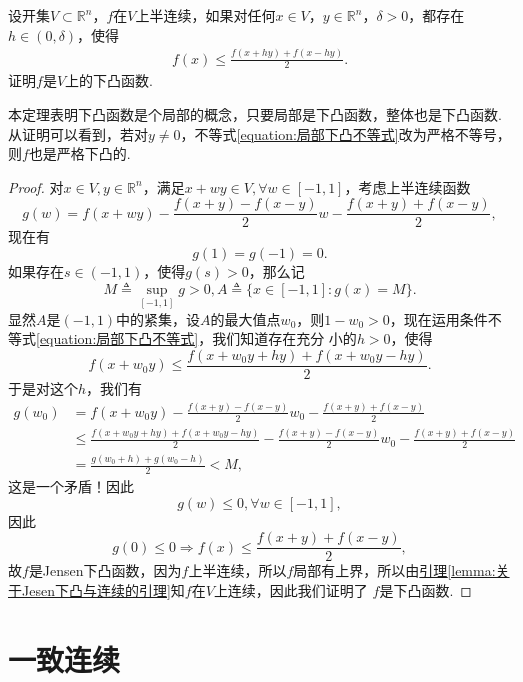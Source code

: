 \documentclass[lang=cn,newtx,10pt,scheme=chinese]{elegantbook}
\begin{document}
\begin{theorem}[下凸函数的局部定义]\label{theorem:下凸函数的局部定义}
设开集\(V\subset\mathbb{R}^n\)，\(f\)在\(V\)上半连续，如果对任何\(x\in V\)，\(y\in\mathbb{R}^n\)，\(\delta>0\)，都存在\(h\in(0,\delta)\)，使得
\begin{align}
f(x)\leqslant\frac{f(x + hy)+f(x - hy)}{2}.\label{equation:局部下凸不等式}
\end{align}
证明\(f\)是\(V\)上的下凸函数.
\end{theorem}
\begin{note}
本定理表明下凸函数是个局部的概念，只要局部是下凸函数，整体也是下凸函数. 从证明可以看到，若对\(y\neq0\)，不等式\eqref{equation:局部下凸不等式}改为严格不等号，则\(f\)也是严格下凸的.
\end{note}
\begin{proof}
对\(x\in V,y\in\mathbb{R}^n\)，满足\(x + wy\in V,\forall w\in[-1,1]\)，考虑上半连续函数
\[
g(w)=f(x + wy)-\frac{f(x + y)-f(x - y)}{2}w-\frac{f(x + y)+f(x - y)}{2},
\]
现在有
\[
g(1)=g(-1)=0.
\]
如果存在\(s\in(-1,1)\)，使得\(g(s)>0\)，那么记
\[
M\triangleq\sup_{[-1,1]}g>0,A\triangleq\{x\in[-1,1]:g(x)=M\}.
\]
显然\(A\)是\((-1,1)\)中的紧集，设\(A\)的最大值点\(w_0\)，则\(1 - w_0>0\)，现在运用条件不等式\eqref{equation:局部下凸不等式}，我们知道存在充分
小的\(h > 0\)，使得
\[
f(x + w_0y)\leqslant\frac{f(x + w_0y+hy)+f(x + w_0y - hy)}{2}.
\]
于是对这个\(h\)，我们有
\begin{align*}
g(w_0)&=f(x + w_0y)-\frac{f(x + y)-f(x - y)}{2}w_0-\frac{f(x + y)+f(x - y)}{2}\\
&\leqslant\frac{f(x + w_0y+hy)+f(x + w_0y - hy)}{2}-\frac{f(x + y)-f(x - y)}{2}w_0-\frac{f(x + y)+f(x - y)}{2}\\
&=\frac{g(w_0 + h)+g(w_0 - h)}{2}<M,
\end{align*}
这是一个矛盾！因此
\[
g(w)\leqslant0,\forall w\in[-1,1],
\]
因此
\[
g(0)\leqslant0\Rightarrow f(x)\leqslant\frac{f(x + y)+f(x - y)}{2},
\]
故\(f\)是Jensen下凸函数，因为\(f\)上半连续，所以\(f\)局部有上界，所以由\hyperref[lemma:关于Jesen下凸与连续的引理]{引理\ref{lemma:关于Jesen下凸与连续的引理}}知\(f\)在\(V\)上连续，因此我们证明了
\(f\)是下凸函数.
\end{proof}







\section{一致连续}
\end{document}
